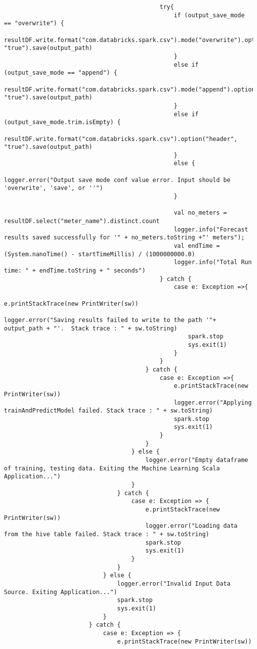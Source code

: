 \documentclass[12pt]{article}
\begin{document}
\begin{lstlisting}
       										try{
       											if (output_save_mode == "overwrite") {
       												resultDF.write.format("com.databricks.spark.csv").mode("overwrite").option("header", "true").save(output_path)
       											}
       											else if (output_save_mode == "append") {
       												resultDF.write.format("com.databricks.spark.csv").mode("append").option("header", "true").save(output_path)
       											}
       											else if (output_save_mode.trim.isEmpty) {
       												resultDF.write.format("com.databricks.spark.csv").option("header", "true").save(output_path)
       											}
       											else {
       												logger.error("Output save mode conf value error. Input should be 'overwrite', 'save', or ''")
       											}
    
       											val no_meters = resultDF.select("meter_name").distinct.count
       											logger.info("Forecast results saved successfully for '" + no_meters.toString +"' meters");
       											val endTime = (System.nanoTime() - startTimeMillis) / (1000000000.0)
       											logger.info("Total Run time: " + endTime.toString + " seconds")
       										} catch {
       											case e: Exception =>{
       												e.printStackTrace(new PrintWriter(sw))
       												logger.error("Saving results failed to write to the path '"+ output_path + "'.  Stack trace : " + sw.toString)
       												spark.stop
       												sys.exit(1)
       											}
       										}
       									} catch {
       										case e: Exception =>{
       											e.printStackTrace(new PrintWriter(sw))
       											logger.error("Applying trainAndPredictModel failed. Stack trace : " + sw.toString)
       											spark.stop
       											sys.exit(1)
       										}
       									}
       								} else {
       									logger.error("Empty dataframe of training, testing data. Exiting the Machine Learning Scala Application...")
       								}
       							} catch {
       								case e: Exception => {
       									e.printStackTrace(new PrintWriter(sw))
       									logger.error("Loading data from the hive table failed. Stack trace : " + sw.toString)
       									spark.stop
       									sys.exit(1)
       								}
       							}
       						} else {
       							logger.error("Invalid Input Data Source. Exiting Application...")
       							spark.stop
       							sys.exit(1)					
       						}
       					} catch {
       						case e: Exception => {
       							e.printStackTrace(new PrintWriter(sw))

\end{lstlisting}
\end{document}
